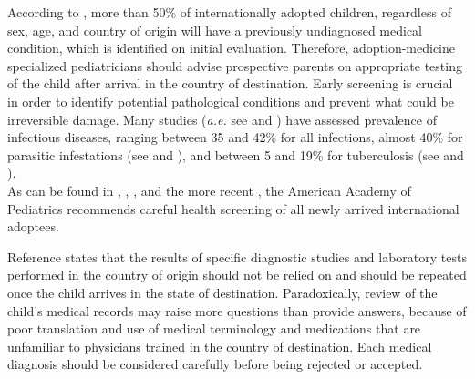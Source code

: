 According to \cite{medicalscreening}, more than 50\% of internationally adopted children, regardless of sex, age, and country of origin will have a previously undiagnosed medical condition, which is identified on initial evaluation. Therefore, adoption-medicine specialized pediatricians should advise prospective parents on appropriate testing of the child after arrival in the country of destination. Early screening is crucial in order to identify potential pathological conditions and prevent what could be irreversible damage. Many studies (\textit{a.e.} see \cite{notonlyinfectious} and \cite{obringer}) have assessed prevalence of infectious diseases, ranging between 35 and 42\% for all infections, almost 40\% for parasitic infestations (see \cite{GNLBIexp} and \cite{sollai}), and between 5 and 19\% for tuberculosis (see \cite{sollai} and \cite{ampofo}).\\
As can be found in \cite{initialeval}, \cite{redbook}, \cite{GNLBIexp}, and the more recent \cite{comphealtheval}, the American Academy of Pediatrics recommends careful health screening of all newly arrived international adoptees.

Reference \cite{nelson} states that the results of specific diagnostic studies and laboratory tests performed in the country of origin should not be relied on and should be repeated once the child arrives in the state of destination. Paradoxically, review of the child’s medical records may raise more questions than provide answers, because of poor translation and use of medical terminology and medications that are unfamiliar to physicians trained in the country of destination. Each medical diagnosis should be considered carefully before being rejected or accepted.

